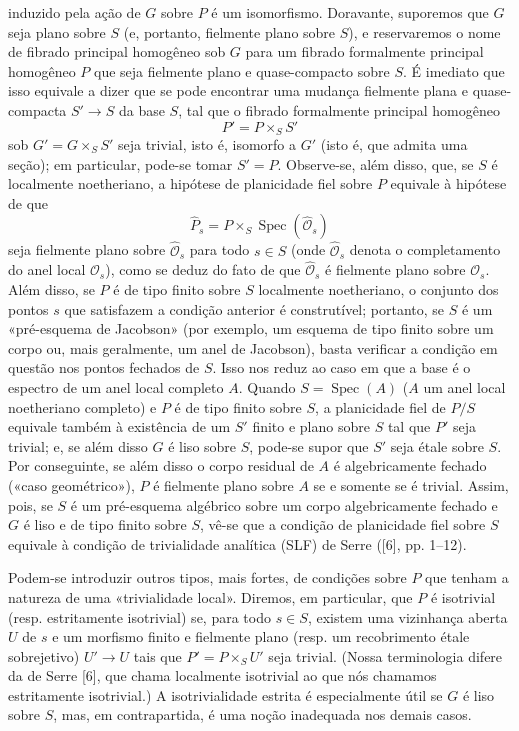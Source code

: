 \documentclass[11pt,twoside,openany]{book}
\numberwithin{equation}{section}
\newcommand{\src}[1]{%
  \phantomsection\hypertarget{src:#1}{}%
  \marginpar{\raggedleft\footnotesize\sffamily #1}%
}
\theoremstyle{plain}
\theoremstyle{definition}
\theoremstyle{remark}
\newcommand{\FgaUnitKey}{frontmatter}
\renewcommand{\src}[1]{%
  \phantomsection\hypertarget{src:\FgaUnitKey:#1}{}%
  \marginpar{\raggedleft\footnotesize\sffamily #1}%
}
\begin{document}
\src{325}
induzido pela ação de $G$ sobre $P$ é um isomorfismo. Doravante, suporemos que
$G$ seja plano sobre $S$ (e, portanto, fielmente plano sobre $S$), e reservaremos
o nome de fibrado principal homogêneo sob $G$ para um fibrado formalmente
principal homogêneo $P$ que seja fielmente plano e quase-compacto sobre $S$.
É imediato que isso equivale a dizer que se pode encontrar uma mudança
fielmente plana e quase-compacta
$S'\longrightarrow S$ da base $S$, tal que o fibrado formalmente principal
homogêneo
\[
  P'=P\times_SS'
\]
sob $G'=G\times_SS'$ seja trivial, isto é, isomorfo a $G'$ (isto é, que
admita uma seção); em particular, pode-se tomar $S'=P$. Observe-se, além disso,
que, se $S$ é localmente noetheriano, a hipótese de planicidade fiel sobre $P$
equivale à hipótese de que
\[
  \widehat P_s=P\times_S\operatorname{Spec}(\widehat{\mathcal O}_s)
\]
seja fielmente plano sobre $\widehat{\mathcal O}_s$ para todo $s\in S$ (onde
$\widehat{\mathcal O}_s$ denota o completamento do anel local
$\mathcal O_s$), como se deduz do fato de que $\widehat{\mathcal O}_s$ é
fielmente plano sobre $\mathcal O_s$. Além disso, se $P$ é de tipo finito sobre
$S$ localmente noetheriano, o conjunto dos pontos $s$ que satisfazem a
condição anterior é construtível; portanto, se $S$ é um «pré-esquema de
Jacobson» (por exemplo, um esquema de tipo finito sobre um corpo ou, mais
geralmente, um anel de Jacobson), basta verificar a
condição em questão nos pontos fechados de $S$. Isso nos reduz ao caso em
que a base é o espectro de um anel local completo $A$. Quando
$S=\operatorname{Spec}(A)$ ($A$ um anel local noetheriano completo) e $P$ é
de tipo finito sobre $S$, a planicidade fiel de $P/S$ equivale também à
existência de um $S'$ finito e plano sobre $S$ tal que $P'$ seja trivial; e, se
além disso $G$ é liso sobre $S$, pode-se supor que $S'$ seja étale sobre $S$.
Por conseguinte, se além disso o corpo residual de $A$ é algebricamente fechado
(«caso geométrico»), $P$ é fielmente plano sobre $A$ se e somente se é trivial.
Assim, pois, se $S$ é um pré-esquema algébrico sobre um corpo algebricamente
fechado e $G$ é liso e de tipo finito sobre $S$, vê-se que a condição de
planicidade fiel sobre $S$ equivale à condição de trivialidade analítica (SLF)
de Serre ([6], pp. 1--12).

Podem-se introduzir outros tipos, mais fortes, de condições sobre $P$ que
tenham a natureza de uma «trivialidade local». Diremos, em particular, que
$P$ é isotrivial (resp. estritamente isotrivial) se, para todo $s\in S$,
existem uma vizinhança aberta $U$ de $s$ e um morfismo finito e fielmente plano
(resp. um recobrimento étale sobrejetivo) $U'\longrightarrow U$ tais que
$P'=P\times_SU'$ seja trivial. (Nossa terminologia difere da de Serre [6], que
chama localmente isotrivial ao que nós chamamos estritamente isotrivial.) A
isotrivialidade estrita é especialmente útil se $G$ é liso sobre $S$, mas, em
contrapartida, é uma noção inadequada nos demais casos.
\end{document}
